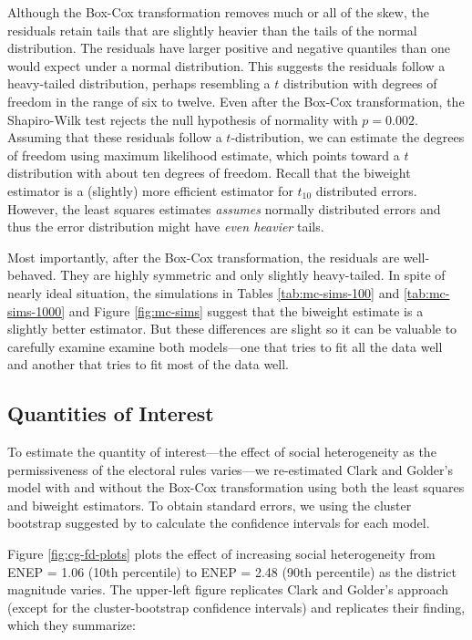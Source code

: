 \documentclass[12pt]{article}
\begin{document}
Although the Box-Cox transformation removes much or all of the skew, the residuals retain tails that are slightly heavier than the tails of the normal distribution. 
The residuals have larger positive and negative quantiles than one would expect under a normal distribution. 
This suggests the residuals follow a heavy-tailed distribution, perhaps resembling a $t$ distribution with degrees of freedom in the range of six to twelve. 
Even after the Box-Cox transformation, the Shapiro-Wilk test rejects the null hypothesis of normality with $p = 0.002$. 
Assuming that these residuals follow a $t$-distribution, we can estimate the degrees of freedom using maximum likelihood estimate, which points toward a $t$ distribution with about ten degrees of freedom. 
Recall that the biweight estimator is a (slightly) more efficient estimator for $t_{10}$ distributed errors. 
However, the least squares estimates \textit{assumes} normally distributed errors and thus the error distribution might have \textit{even heavier} tails.

Most importantly, after the Box-Cox transformation, the residuals are well-behaved. 
They are highly symmetric and only slightly heavy-tailed. 
In spite of nearly ideal situation, the simulations in Tables \ref{tab:mc-sims-100} and \ref{tab:mc-sims-1000} and Figure \ref{fig:mc-sims} suggest that the biweight estimate is a slightly better estimator. 
But these differences are slight so it can be valuable to carefully examine examine both models---one that tries to fit all the data well and another that tries to fit most of the data well.

\subsection*{Quantities of Interest}

To estimate the quantity of interest---the effect of social heterogeneity as the permissiveness of the electoral rules varies---we re-estimated Clark and Golder's model with and without the Box-Cox transformation using both the least squares and biweight estimators. 
To obtain standard errors, we using the cluster bootstrap suggested by \cite{Harden2012} to calculate the confidence intervals for each model.

Figure \ref{fig:cg-fd-plots} plots the effect of increasing social heterogeneity from ENEP = 1.06 (10th percentile) to ENEP = 2.48 (90th percentile) as the district magnitude varies. 
The upper-left figure replicates Clark and Golder's approach (except for the cluster-bootstrap confidence intervals) and replicates their finding, which they summarize:
\end{document}
